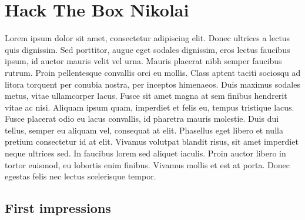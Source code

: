 \documentclass[../main.tex]{subfiles}
\begin{document}
\section{Hack The Box Nikolai}

Lorem ipsum dolor sit amet, consectetur adipiscing elit. Donec ultrices a lectus quis dignissim. Sed porttitor, augue eget sodales dignissim, eros lectus faucibus ipsum, id auctor mauris velit vel urna. Mauris placerat nibh semper faucibus rutrum. Proin pellentesque convallis orci eu mollis. Class aptent taciti sociosqu ad litora torquent per conubia nostra, per inceptos himenaeos. Duis maximus sodales metus, vitae ullamcorper lacus. Fusce sit amet magna at sem finibus hendrerit vitae ac nisi. Aliquam ipsum quam, imperdiet et felis eu, tempus tristique lacus. Fusce placerat odio eu lacus convallis, id pharetra mauris molestie. Duis dui tellus, semper eu aliquam vel, consequat at elit. Phasellus eget libero et nulla pretium consectetur id at elit. Vivamus volutpat blandit risus, sit amet imperdiet neque ultrices sed. In faucibus lorem sed aliquet iaculis. Proin auctor libero in tortor euismod, eu lobortis enim finibus. Vivamus mollis et est at porta. Donec egestas felis nec lectus scelerisque tempor.

\subsection{First impressions}
\end{document}
